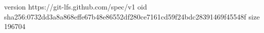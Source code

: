version https://git-lfs.github.com/spec/v1
oid sha256:0732dd3a8a868effe67b48e86552df280ce7161cd59f24bdc28391469f45548f
size 196704

